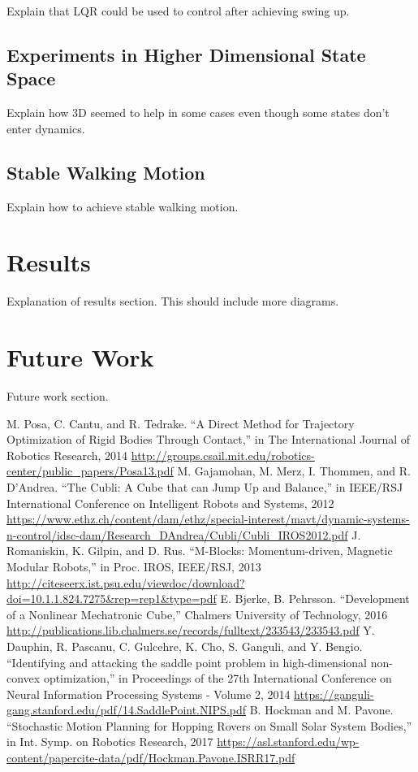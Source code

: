 \documentclass[conference]{IEEEtran}
\begin{document}
Explain that LQR could be used to control after achieving swing up.

\subsection{Experiments in Higher Dimensional State Space}
Explain how 3D seemed to help in some cases even though some states don't enter dynamics.

\subsection{Stable Walking Motion}

Explain how to achieve stable walking motion.

\section*{Results}

Explanation of results section. This should include more diagrams.

\section*{Future Work}

Future work section.

\begin{thebibliography}{00}
 M. Posa, C. Cantu, and R. Tedrake. ``A Direct Method for Trajectory Optimization of Rigid Bodies Through Contact,'' in The International Journal of Robotics Research, 2014 \url{http://groups.csail.mit.edu/robotics-center/public_papers/Posa13.pdf}
 M. Gajamohan, M. Merz, I. Thommen, and R. D'Andrea. ``The Cubli: A Cube that can Jump Up and Balance,'' in IEEE/RSJ International Conference on
Intelligent Robots and Systems, 2012 \url{https://www.ethz.ch/content/dam/ethz/special-interest/mavt/dynamic-systems-n-control/idsc-dam/Research_DAndrea/Cubli/Cubli_IROS2012.pdf}
 J. Romaniskin, K. Gilpin, and D. Rus. ``M-Blocks: Momentum-driven, Magnetic Modular Robots,'' in Proc. IROS, IEEE/RSJ, 2013
\url{http://citeseerx.ist.psu.edu/viewdoc/download?doi=10.1.1.824.7275&rep=rep1&type=pdf}
 E. Bjerke, B. Pehrsson. ``Development of a Nonlinear Mechatronic Cube,'' Chalmers University of Technology, 2016
\url{http://publications.lib.chalmers.se/records/fulltext/233543/233543.pdf}
 Y. Dauphin, R. Pascanu, C. Gulcehre, K. Cho, S. Ganguli, and Y. Bengio. ``Identifying and attacking the saddle point problem in high-dimensional non-convex optimization,'' in Proceedings of the 27th International Conference on Neural Information Processing Systems - Volume 2, 2014
\url{https://ganguli-gang.stanford.edu/pdf/14.SaddlePoint.NIPS.pdf}
 B. Hockman and M. Pavone. ``Stochastic Motion Planning for Hopping Rovers on Small Solar System Bodies,'' in Int. Symp. on Robotics Research, 2017
\url{https://asl.stanford.edu/wp-content/papercite-data/pdf/Hockman.Pavone.ISRR17.pdf}
\end{thebibliography}


\vspace{12pt}
\end{document}
